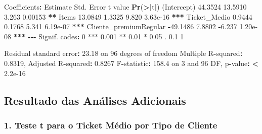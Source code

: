 \documentclass[
]{article}
\newenvironment{Shaded}{\begin{snugshade}}{\end{snugshade}}
\newcommand{\DecValTok}[1]{\textcolor[rgb]{0.00,0.00,0.81}{#1}}
\newcommand{\ErrorTok}[1]{\textcolor[rgb]{0.64,0.00,0.00}{\textbf{#1}}}
\newcommand{\FloatTok}[1]{\textcolor[rgb]{0.00,0.00,0.81}{#1}}
\newcommand{\FunctionTok}[1]{\textcolor[rgb]{0.13,0.29,0.53}{\textbf{#1}}}
\newcommand{\NormalTok}[1]{#1}
\newcommand{\SpecialCharTok}[1]{\textcolor[rgb]{0.81,0.36,0.00}{\textbf{#1}}}
\newcommand{\StringTok}[1]{\textcolor[rgb]{0.31,0.60,0.02}{#1}}
\begin{document}
\begin{Shaded}
\begin{Highlighting}[]
\NormalTok{Coefficients}\SpecialCharTok{:}
\NormalTok{                       Estimate Std. Error t value }\FunctionTok{Pr}\NormalTok{(}\SpecialCharTok{\textgreater{}}\ErrorTok{|}\NormalTok{t}\SpecialCharTok{|}\NormalTok{)}
\NormalTok{(Intercept)             }\FloatTok{44.3524}    \FloatTok{13.5910}   \FloatTok{3.263}  \FloatTok{0.00153} \SpecialCharTok{**} 
\NormalTok{Items                   }\FloatTok{13.0849}     \FloatTok{1.3325}   \FloatTok{9.820} \FloatTok{3.63e{-}16} \SpecialCharTok{**}\ErrorTok{*}
\NormalTok{Ticket\_Medio             }\FloatTok{0.9444}     \FloatTok{0.1768}   \FloatTok{5.341} \FloatTok{6.19e{-}07} \SpecialCharTok{**}\ErrorTok{*}
\NormalTok{Cliente\_premiumRegular }\SpecialCharTok{{-}}\FloatTok{49.1486}     \FloatTok{7.8802}  \SpecialCharTok{{-}}\FloatTok{6.237} \FloatTok{1.20e{-}08} \SpecialCharTok{**}\ErrorTok{*}
\SpecialCharTok{{-}{-}{-}}
\NormalTok{Signif. codes}\SpecialCharTok{:}  \DecValTok{0} \StringTok{\textquotesingle{}***\textquotesingle{}} \FloatTok{0.001} \StringTok{\textquotesingle{}**\textquotesingle{}} \FloatTok{0.01} \StringTok{\textquotesingle{}*\textquotesingle{}} \FloatTok{0.05} \StringTok{\textquotesingle{}.\textquotesingle{}} \FloatTok{0.1} \StringTok{\textquotesingle{} \textquotesingle{}} \DecValTok{1}

\NormalTok{Residual standard error}\SpecialCharTok{:} \FloatTok{23.18}\NormalTok{ on }\DecValTok{96}\NormalTok{ degrees of freedom}
\NormalTok{Multiple R}\SpecialCharTok{{-}}\NormalTok{squared}\SpecialCharTok{:}  \FloatTok{0.8319}\NormalTok{,    Adjusted R}\SpecialCharTok{{-}}\NormalTok{squared}\SpecialCharTok{:}  \FloatTok{0.8267}
\NormalTok{F}\SpecialCharTok{{-}}\NormalTok{statistic}\SpecialCharTok{:} \FloatTok{158.4}\NormalTok{ on }\DecValTok{3}\NormalTok{ and }\DecValTok{96}\NormalTok{ DF,  p}\SpecialCharTok{{-}}\NormalTok{value}\SpecialCharTok{:} \ErrorTok{\textless{}} \FloatTok{2.2e{-}16}
\end{Highlighting}
\end{Shaded}

\subsection{Resultado das Análises
Adicionais}\label{resultado-das-anuxe1lises-adicionais}

\subsubsection{1. Teste t para o Ticket Médio por Tipo de
Cliente}\label{teste-t-para-o-ticket-muxe9dio-por-tipo-de-cliente}
\end{document}
